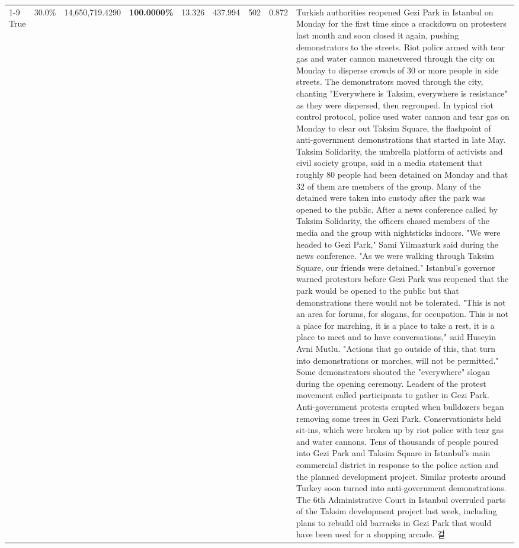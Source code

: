 \begin{table}[H]
\begin{tabular}{lllrlllll}
\cline{1-9}
True & 30.0\% & 14,650,719.4290 & \bfseries \color{red} 100.0000\% & 13.326 & 437.994 & 502 & 0.872 & Turkish authorities reopened Gezi Park in Istanbul on Monday for the first time since a crackdown on protesters last month and soon closed it again, pushing demonstrators to the streets. Riot police armed with tear gas and water cannon maneuvered through the city on Monday to disperse crowds of 30 or more people in side streets. The demonstrators moved through the city, chanting "Everywhere is Taksim, everywhere is resistance" as they were dispersed, then regrouped. In typical riot control protocol, police used water cannon and tear gas on Monday to clear out Taksim Square, the flashpoint of anti-government demonstrations that started in late May. Taksim Solidarity, the umbrella platform of activists and civil society groups, said in a media statement that roughly 80 people had been detained on Monday and that 32 of them are members of the group. Many of the detained were taken into custody after the park was opened to the public. After a news conference called by Taksim Solidarity, the officers chased members of the media and the group with nightsticks indoors. "We were headed to Gezi Park," Sami Yilmazturk said during the news conference. "As we were walking through Taksim Square, our friends were detained." Istanbul's governor warned protestors before Gezi Park was reopened that the park would be opened to the public but that demonstrations there would not be tolerated. "This is not an area for forums, for slogans, for occupation. This is not a place for marching, it is a place to take a rest, it is a place to meet and to have conversations," said Huseyin Avni Mutlu. "Actions that go outside of this, that turn into demonstrations or marches, will not be permitted." Some demonstrators shouted the "everywhere" slogan during the opening ceremony. Leaders of the protest movement called participants to gather in Gezi Park. Anti-government protests erupted when bulldozers began removing some trees in Gezi Park. Conservationists held sit-ins, which were broken up by riot police with tear gas and water cannons. Tens of thousands of people poured into Gezi Park and Taksim Square in Istanbul's main commercial district in response to the police action and the planned development project. Similar protests around Turkey soon turned into anti-government demonstrations. The 6th Administrative Court in Istanbul overruled parts of the Taksim development project last week, including plans to rebuild old barracks in Gezi Park that would have been used for a shopping arcade. 걸 \\

\end{tabular}
\end{table}
